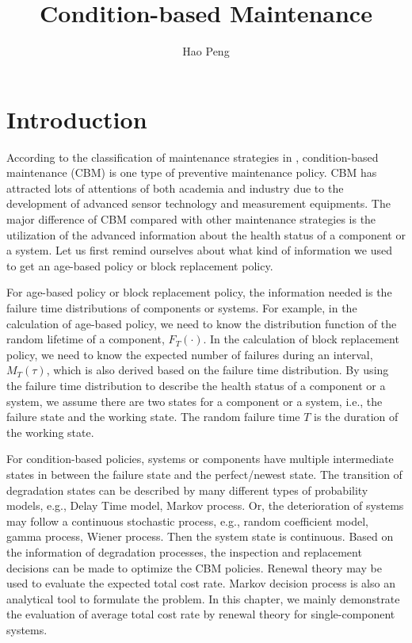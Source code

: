 \documentclass[10pt,a4paper]{article}
\author{Hao Peng}
\title{Condition-based Maintenance}
\theoremstyle{remark}
\begin{document}
\maketitle
\section{Introduction}
According to the classification of maintenance strategies in \cite{Arts14}, condition-based maintenance (CBM) is one type of preventive maintenance policy. CBM has attracted lots of attentions of both academia and industry due to the development of advanced sensor technology and measurement equipments. The major difference of CBM compared with other maintenance strategies is the utilization of the advanced information about the health status of a component or a system. Let us first remind ourselves about what kind of information we used to get an age-based policy or block replacement policy.

For age-based policy or block replacement policy, the information needed is the failure time distributions of components or systems. For example, in the calculation of age-based policy, we need to know the distribution function of the random lifetime of a component, $F_{T}(\cdot)$. In the calculation of block replacement policy, we need to know the expected number of failures during an interval, $M_{T}(\tau)$, which is also derived based on the failure time distribution. By using the failure time distribution to describe the health status of a component or a system, we assume there are two states for a component or a system, i.e., the failure state and the working state. The random failure time $T$ is the duration of the working state.

For condition-based policies, systems or components have multiple intermediate states in between the failure state and the perfect/newest state. The transition of degradation states can be described by many different types of probability models, e.g., Delay Time model, Markov process. Or, the deterioration of systems may follow a continuous stochastic process, e.g., random coefficient model, gamma process, Wiener process. Then the system state is continuous. Based on the information of degradation processes, the inspection and replacement decisions can be made to optimize the CBM policies. Renewal theory may be used to evaluate the expected total cost rate. Markov decision process is also an analytical tool to formulate the problem. In this chapter, we mainly demonstrate the evaluation of average total cost rate by renewal theory for single-component systems. 
\end{document}
